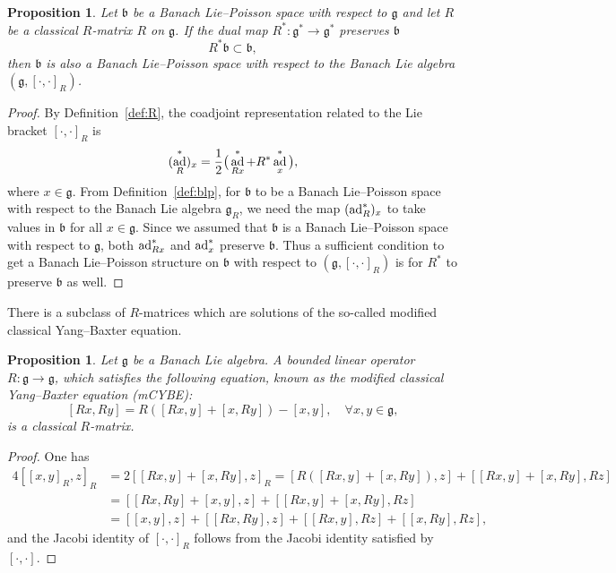 \documentclass[a4paper,12pt,reqno]{amsart}%
\newtheorem{proposition}[theorem]{Proposition}
\theoremstyle{definition}
\theoremstyle{remark}
\numberwithin{theorem}{section}
\numberwithin{equation}{section}
\newcommand{\1}{{\bf 1}}
\DeclareMathOperator{\ad}{\textnormal{ad}}
\newcommand{\g}{{\mathfrak g}}
\newcommand{\bg}{{\mathfrak b}}
\begin{document}
\begin{proposition}\label{RLiePoisson}
Let $\bg$ be a Banach Lie--Poisson space with respect to $\g$ and let $R$ be a classical $R$-matrix $R$ on $\g$. If the dual map $R^*:\g^*\to\g^*$ preserves $\bg$
\[ R^*\bg\subset \bg,\] 
then $\bg$ is also a Banach Lie--Poisson space with respect to the Banach Lie algebra $(\g, [\cdot, \cdot]_R)$.
\end{proposition}
\begin{proof}
    By Definition~\ref{def:R}, the coadjoint representation related to the Lie bracket $[\cdot,\cdot]_R$ is
    \begin{equation}\label{coad_R}
    (\ad_R^*)_x = \frac12\big(\ad^*_{Rx} + R^*\ad^*_x\big),
    \end{equation}
    where $x\in\g$.
        From Definition~\ref{def:blp}, for $\bg$ to be a Banach Lie--Poisson space with respect to the Banach Lie algebra $\g_R$, we need the map $(\ad_R^*)_x$ to take values in $\bg$ for all $x\in\g$. Since we assumed that $\bg$ is a Banach Lie--Poisson space with respect to $\g$, both $\ad^*_{Rx}$ and $\ad^*_x$ preserve $\bg$. Thus a sufficient condition to get a Banach Lie--Poisson structure on $\bg$ with respect to $\left(\g, [\cdot, \cdot]_R\right)$ is for $R^*$ to preserve $\bg$ as well.
\end{proof}


There is a subclass of $R$-matrices which are solutions of the so-called modified classical Yang--Baxter equation.
\begin{proposition}
Let $\mathfrak{g}$ be a Banach Lie algebra. A bounded linear operator $R:\mathfrak{g}\rightarrow \mathfrak{g}$, which satisfies the following equation, known as the \textit{modified classical Yang--Baxter equation} (mCYBE): 
\begin{equation}\label{mCYBE}
[Rx, Ry] = R\left([Rx, y] + [x, Ry]\right) - [x, y], \quad \forall x, y \in\mathfrak{g},
\end{equation}
is a classical $R$-matrix.
\end{proposition}
\begin{proof}
One has 
\[
\begin{array}{ll}
4\left[[x, y]_R, z\right]_R &= 2\left[[Rx, y] + [x, Ry], z\right]_R = \left[R\left([Rx, y] + [x, Ry]\right), z\right] +\left[[Rx, y] + [x, Ry],Rz\right]\\
& = \left[[Rx, Ry] + [x, y], z\right] + \left[[Rx, y] + [x, Ry],Rz\right] \\
& = \left[[x, y], z\right] + \left[[Rx, Ry], z\right] + \left[[Rx, y],  Rz\right] + \left[[x, Ry], Rz\right],
\end{array}
\]
and the Jacobi identity of $[\cdot, \cdot]_R$ follows from the Jacobi identity satisfied by $[\cdot, \cdot]$.
\end{proof}
\end{document}
